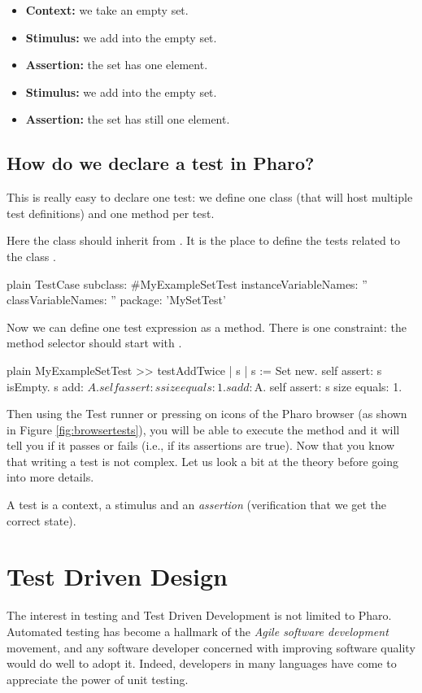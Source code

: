 \documentclass[10pt,twoside,english]{_support/latex/sbabook/sbabook}
\begin{document}
\begin{itemize}
\item \textbf{Context:} we take an empty set.
\item \textbf{Stimulus:} we add  into the empty set.
\item \textbf{Assertion:} the set has one element.
\item \textbf{Stimulus:} we add  into the empty set.
\item \textbf{Assertion:} the set has still one element.
\end{itemize}
\subsection{How do we declare a test in Pharo?}
This is really easy to declare one test: we define one class (that will host multiple test definitions) and one method per test.

Here the class  should inherit from . It is the place to define the tests
related to the class . 

\begin{displaycode}{plain}
TestCase subclass: #MyExampleSetTest
	instanceVariableNames: ''
	classVariableNames: ''
	package: 'MySetTest'
\end{displaycode}

Now we can define one test expression as a method. There is one constraint: the method selector should start with .

\begin{displaycode}{plain}
MyExampleSetTest >> testAddTwice
	| s |
	s := Set new. 
	self assert: s isEmpty.
	s add: $A.
	self assert: s size equals: 1.
	s add: $A.
	self assert: s size equals: 1.
\end{displaycode}

Then using the Test runner or pressing on icons of the Pharo browser (as shown in Figure \ref{fig:browsertests}), you will be able to execute the method  and it will tell you if it passes or fails (i.e., if its assertions are true). Now that you know that writing a test is not complex. Let us look a bit at the theory before going into more details. 

\begin{coffee}
A test is a context, a stimulus and an \textit{assertion} (verification that we get the correct state).
\end{coffee}
\section{Test Driven Design}
The interest in testing and Test Driven Development is not limited to Pharo.
 Automated testing has become a hallmark of the \textit{Agile software
development} movement, and any software developer concerned with improving
software quality would do well to adopt it. Indeed, developers in many languages
have come to appreciate the power of unit testing.
\end{document}
